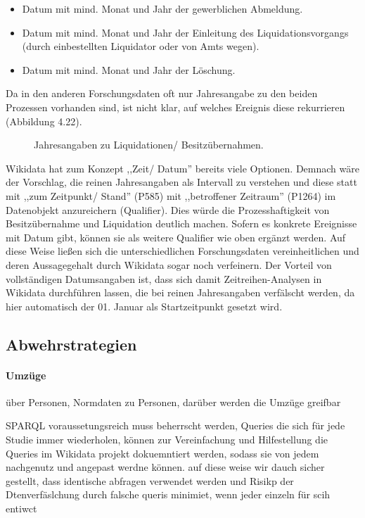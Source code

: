\begin{itemize}
    \item Datum mit mind. Monat und Jahr der gewerblichen Abmeldung.
    \item Datum mit mind. Monat und Jahr der Einleitung des Liquidationsvorgangs (durch einbestellten Liquidator oder von Amts wegen).
    \item Datum mit mind. Monat und Jahr der Löschung.
\end{itemize}

Da in den anderen Forschungsdaten oft nur Jahresangabe zu den beiden Prozessen vorhanden sind, ist nicht klar, auf welches Ereignis diese rekurrieren (Abbildung 4.22).   

\begin{figure}[h]
    \centering
    \caption{Jahresangaben zu Liquidationen/ Besitzübernahmen.}
    \label{fig:x cubed graph}
\end{figure}

Wikidata hat zum Konzept ,,Zeit/ Datum'' bereits viele Optionen. Demnach wäre der Vorschlag, die reinen Jahresangaben als Intervall zu verstehen und diese statt mit ,,zum Zeitpunkt/ Stand'' (P585) mit ,,betroffener Zeitraum'' (P1264) im Datenobjekt anzureichern (Qualifier). Dies würde die Prozesshaftigkeit von Besitzübernahme und Liquidation deutlich machen. Sofern es konkrete Ereignisse mit Datum gibt, können sie als weitere Qualifier wie oben ergänzt werden. Auf diese Weise ließen sich die unterschiedlichen Forschungsdaten vereinheitlichen und deren Aussagegehalt durch Wikidata sogar noch verfeinern. Der Vorteil von vollständigen Datumsangaben ist, dass sich damit Zeitreihen-Analysen in Wikidata durchführen lassen, die bei reinen Jahresangaben verfälscht werden, da hier automatisch der 01. Januar als Startzeitpunkt gesetzt wird. 


\subsection{Abwehrstrategien}
\paragraph{Umzüge}

über Personen, Normdaten zu Personen, darüber werden die Umzüge greifbar


SPARQL voraussetungsreich muss beherrscht werden, Queries die sich für jede Studie immer wiederholen, können zur Vereinfachung und Hilfestellung die Queries im Wikidata projekt dokuemntiert werden, sodass sie von jedem nachgenutz und angepast werdne können. auf diese weise wir dauch sicher gestellt, dass identische abfragen verwendet werden und Risikp der Dtenverfäslchung durch falsche queris minimiet, wenn jeder einzeln für scih entiwct
  
